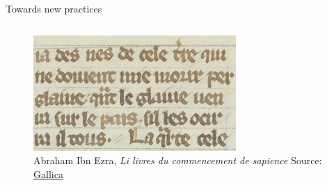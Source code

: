 \documentclass[aspectratio=169]{beamer}
\begin{document}

    \begin{frame}{Towards new practices}
        \small
        \begin{columns}[t]
            \begin{column}{.52\textwidth}
                    \vspace{-1.5em}
                    \begin{figure}
                        \centering
			            \includegraphics[width=\textwidth,height=0.6\textheight,keepaspectratio]{nlp-for-ch/images/MA_btv1b10465182x_137.jpeg}
                        \caption{\small Abraham Ibn Ezra, \textit{Li livres du commencement de sapience} \tiny{Source: \href{https://gallica.bnf.fr/ark:/12148/btv1b10465182x/f137.item}{Gallica}}}
                        \label{fig:ibnEzra}
                    \end{figure}
                    

\end{column}
\end{columns}
\end{frame}
\end{document}
